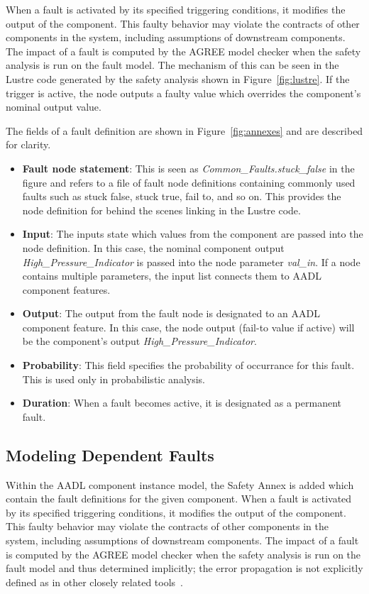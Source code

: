 When a fault is activated by its specified triggering conditions, it modifies the output of the component. This faulty behavior may violate the contracts of other components in the system, including assumptions of downstream components. The impact of a fault is computed by the AGREE model checker when the safety analysis is run on the fault model. The mechanism of this can be seen in the Lustre code generated by the safety analysis shown in Figure~\ref{fig:lustre}. If the trigger is active, the node outputs a faulty value which overrides the component's nominal output value.  

The fields of a fault definition are shown in Figure~\ref{fig:annexes} and are described for clarity.
\begin{itemize}
\item \textbf{Fault node statement}: This is seen as \textit{Common\_Faults.stuck\_false} in the figure and refers to a file of fault node definitions containing commonly used faults such as stuck false, stuck true, fail to, and so on. This provides the node definition for behind the scenes linking in the Lustre code.
\item \textbf{Input}: The inputs state which values from the component are passed into the node definition. In this case, the nominal component output \textit{High\_Pressure\_Indicator} is passed into the node parameter \textit{val\_in}. If a node contains multiple parameters, the input list connects them to AADL component features.
\item \textbf{Output}: The output from the fault node is designated to an AADL component feature. In this case, the node output (fail-to value if active) will be the component's output \textit{High\_Pressure\_Indicator}. 
\item \textbf{Probability}: This field specifies the probability of occurrance for this fault. This is used only in probabilistic analysis.
\item \textbf{Duration}: When a fault becomes active, it is designated as a permanent fault. 
\end{itemize}

\subsection{Modeling Dependent Faults}
Within the AADL component instance model, the Safety Annex is added which contain the fault definitions for the given component. When a fault is activated by its specified triggering conditions, it modifies the output of the component. This faulty behavior may violate the contracts of other components in the system, including assumptions of downstream components. The impact of a fault is computed by the AGREE model checker when the safety analysis is run on the fault model and thus determined implicitly; the error propagation is not explicitly defined as in other closely related tools~\cite{EMV2,compass30toolset}. 

